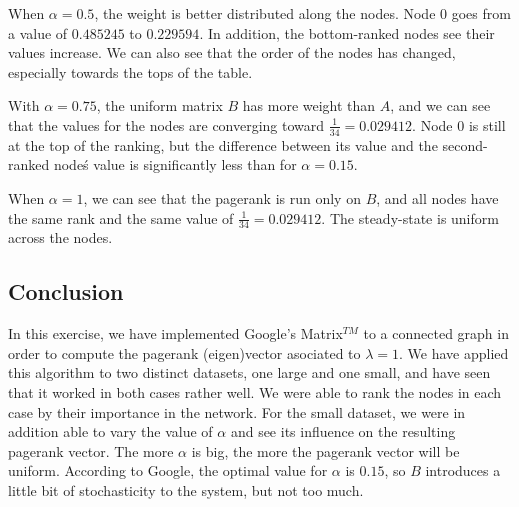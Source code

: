 \documentclass[]{article}
\begin{document}
When $\alpha = 0.5$, the weight is better distributed along the nodes. Node $0$ goes from a value of $0.485245$ to $0.229594$. In addition, the bottom-ranked nodes see their values increase. We can also see that the order of the nodes has changed, especially towards the tops of the table.

With $\alpha = 0.75$, the uniform matrix $B$ has more weight than $A$, and we can see that the values for the nodes are converging toward $\frac{1}{34} = 0.029412$. Node $0$ is still at the top of the ranking, but the difference between its value and the second-ranked nodeś value is significantly less than for $\alpha = 0.15$.

When $\alpha = 1$, we can see that the pagerank is run only on $B$, and all nodes have the same rank and the same value of $\frac{1}{34} = 0.029412$. The steady-state is uniform across the nodes.

\subsection*{Conclusion}
In this exercise, we have implemented Google's Matrix$^{TM}$ to a connected graph in order to compute the pagerank (eigen)vector asociated to $\lambda = 1$. We have applied this algorithm to two distinct datasets, one large and one small, and have seen that it worked in both cases rather well. We were able to rank the nodes in each case by their importance in the network. For the small dataset, we were in addition able to vary the value of $\alpha$ and see its influence on the resulting pagerank vector. The more $\alpha$ is big, the more the pagerank vector will be uniform. According to Google, the optimal value for $\alpha$ is $0.15$, so $B$ introduces a little bit of stochasticity to the system, but not too much.
\end{document}
